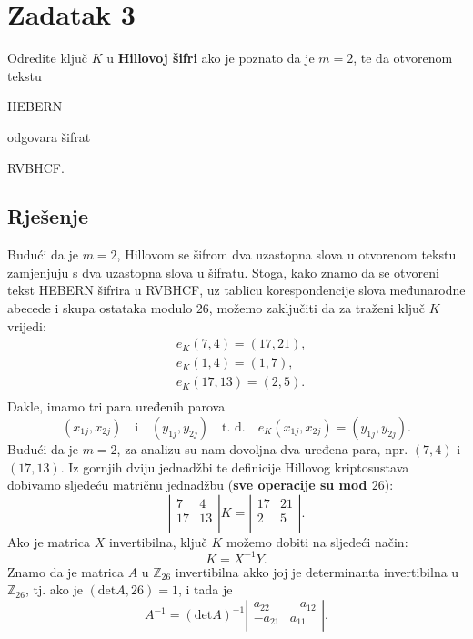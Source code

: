 \documentclass[a4paper,12pt,oneside]{article}
\begin{document}
\newpage
\section*{Zadatak 3}
Odredite ključ $K$ u \textbf{Hillovoj šifri} ako je poznato da je $m = 2$, te da
otvorenom tekstu
\begin{center}
HEBERN
\end{center}
odgovara šifrat
\begin{center}
RVBHCF.
\end{center}
\subsection*{Rješenje}
Budući da je $m = 2$, Hillovom se šifrom dva uzastopna slova u otvorenom tekstu zamjenjuju s dva uzastopna slova u šifratu. Stoga, kako znamo da se otvoreni tekst HEBERN šifrira u RVBHCF, uz tablicu korespondencije slova međunarodne abecede i skupa ostataka modulo $26$, možemo zaključiti da za traženi ključ $K$ vrijedi:
\begin{align*}
	&e_K(7, 4) = (17, 21), \\
	&e_K(1, 4) = (1, 7), \\
	&e_K(17, 13) = (2, 5). \\
\end{align*}
Dakle, imamo tri para uređenih parova
$$(x_{1j}, x_{2j}) \quad \text{i} \quad (y_{1j}, y_{2j}) \quad \text{t. d.} \quad e_K(x_{1j}, x_{2j}) = (y_{1j}, y_{2j}). $$
Budući da je $m = 2$, za analizu su nam dovoljna dva uređena para, npr. $(7, 4)$ i $(17, 13)$.
Iz gornjih dviju  jednadžbi te definicije Hillovog kriptosustava dobivamo sljedeću matričnu jednadžbu (\textbf{sve operacije su mod $26$}):
$$\left|\begin{matrix} 7 & 4 \\
	                   17 & 13 \\ \end{matrix}\right| K = \left|\begin{matrix} 17 & 21 \\
	                  2 & 5 \\ \end{matrix}\right| .$$
Ako je matrica $X$ invertibilna, ključ $K$ možemo dobiti na sljedeći način:
$$K = X^{-1}Y.$$
Znamo da je matrica $A$ u $\mathbb{Z}_{26}$ invertibilna akko joj je determinanta invertibilna u $\mathbb{Z}_{26}$, tj. ako je $(\text{det}A, 26) = 1$, i tada je
$$A^{-1} = (\text{det}A)^{-1}\left|\begin{matrix} a_{22} & -a_{12} \\
	-a_{21} & a_{11} \\ \end{matrix}\right| .$$
\end{document}
